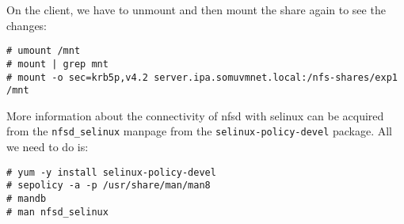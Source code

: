 \noindent
On the client, we have to unmount and then mount the share again to see the changes:

\vspace{-15pt}
\begin{verbatim}
# umount /mnt
# mount | grep mnt
# mount -o sec=krb5p,v4.2 server.ipa.somuvmnet.local:/nfs-shares/exp1 /mnt
\end{verbatim}
\vspace{-10pt}	

\noindent
More information about the connectivity of nfsd with selinux can be acquired from the \verb|nfsd_selinux| manpage from the \verb|selinux-policy-devel| package. All we need to do is:

\vspace{-15pt}
\begin{verbatim}
# yum -y install selinux-policy-devel
# sepolicy -a -p /usr/share/man/man8
# mandb
# man nfsd_selinux
\end{verbatim}
\vspace{-10pt}	